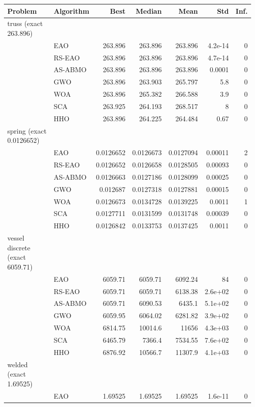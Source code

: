 \begin{tabular}{@{}llrrrrr@{}}
\toprule
Problem & Algorithm & Best & Median & Mean & Std & Inf. \\
\midrule
truss (exact 263.896) & & & & & & \\
 & EAO & 263.896 & 263.896 & 263.896 & 4.2e-14 & 0 \\
 & RS-EAO & 263.896 & 263.896 & 263.896 & 4.7e-14 & 0 \\
 & AS-ABMO & 263.896 & 263.896 & 263.896 & 0.0001 & 0 \\
 & GWO & 263.896 & 263.903 & 265.797 & 5.8 & 0 \\
 & WOA & 263.896 & 265.382 & 266.588 & 3.9 & 0 \\
 & SCA & 263.925 & 264.193 & 268.517 & 8 & 0 \\
 & HHO & 263.896 & 264.225 & 264.484 & 0.67 & 0 \\
spring (exact 0.0126652) & & & & & & \\
 & EAO & 0.0126652 & 0.0126673 & 0.0127094 & 0.00011 & 2 \\
 & RS-EAO & 0.0126652 & 0.0126658 & 0.0128505 & 0.00093 & 0 \\
 & AS-ABMO & 0.0126663 & 0.0127186 & 0.0128099 & 0.00025 & 0 \\
 & GWO & 0.012687 & 0.0127318 & 0.0127881 & 0.00015 & 0 \\
 & WOA & 0.0126673 & 0.0134728 & 0.0139225 & 0.0011 & 1 \\
 & SCA & 0.0127711 & 0.0131599 & 0.0131748 & 0.00039 & 0 \\
 & HHO & 0.0126842 & 0.0133753 & 0.0137425 & 0.0011 & 0 \\
vessel discrete (exact 6059.71) & & & & & & \\
 & EAO & 6059.71 & 6059.71 & 6092.24 & 84 & 0 \\
 & RS-EAO & 6059.71 & 6059.71 & 6138.38 & 2.6e+02 & 0 \\
 & AS-ABMO & 6059.71 & 6090.53 & 6435.1 & 5.1e+02 & 0 \\
 & GWO & 6059.95 & 6064.02 & 6281.82 & 3.9e+02 & 0 \\
 & WOA & 6814.75 & 10014.6 & 11656 & 4.3e+03 & 0 \\
 & SCA & 6465.79 & 7366.4 & 7534.55 & 7.6e+02 & 0 \\
 & HHO & 6876.92 & 10566.7 & 11307.9 & 4.1e+03 & 0 \\
welded (exact 1.69525) & & & & & & \\
 & EAO & 1.69525 & 1.69525 & 1.69525 & 1.6e-11 & 0 \\

\end{tabular}
